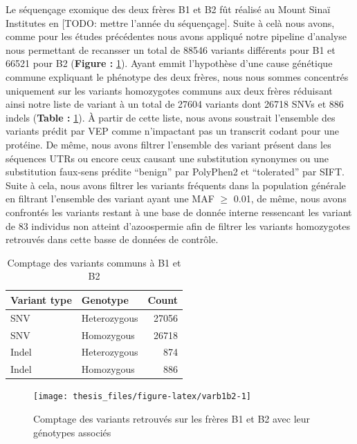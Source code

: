 \documentclass[12pt,twoside]{reedthesis}
\theoremstyle{definition}
\theoremstyle{definition}
\theoremstyle{remark}
\begin{document}
  Le séquençage exomique des deux frères B1 et B2 fût réalisé au Mount
  Sinaï Institutes en {[}TODO: mettre l'année du séquençage{]}. Suite à
  celà nous avons, comme pour les études précédentes nous avons appliqué
  notre pipeline d'analyse nous permettant de recansser un total de 88546
  variants différents pour B1 et 66521 pour B2 (\textbf{Figure :
  }\ref{fig:varb1b2}). Ayant emmit l'hypothèse d'une cause génétique
  commune expliquant le phénotype des deux frères, nous nous sommes
  concentrés uniquement sur les variants homozygotes communs aux deux
  frères réduisant ainsi notre liste de variant à un total de 27604
  variants dont 26718 SNVs et 886 indels (\textbf{Table :
  }\ref{tab:tabcommonvar}). À partir de cette liste, nous avons soustrait
  l'ensemble des variants prédit par VEP comme n'impactant pas un
  transcrit codant pour une protéine. De même, nous avons filtrer
  l'ensemble des variant présent dans les séquences UTRs ou encore ceux
  causant une substitution synonymes ou une substitution faux-sens prédite
  ``benign'' par PolyPhen2 et ``tolerated'' par SIFT. Suite à cela, nous
  avons filtrer les variants fréquents dans la population générale en
  filtrant l'ensemble des variant ayant une MAF \(\ge\) 0.01, de même,
  nous avons confrontés les variants restant à une base de donnée interne
  ressencant les variant de 83 individus non atteint d'azoospermie afin de
  filtrer les variants homozygotes retrouvés dans cette basse de données
  de contrôle.
  
  \begin{table}
  
  \caption{\label{tab:tabcommonvar}Comptage des variants communs à B1 et B2}
  \centering
  \begin{tabular}[t]{l|l|r}
  \hline
  Variant type & Genotype & Count\\
  \hline
  SNV & Heterozygous & 27056\\
  \hline
  SNV & Homozygous & 26718\\
  \hline
  Indel & Heterozygous & 874\\
  \hline
  Indel & Homozygous & 886\\
  \hline
  \end{tabular}
  \end{table}
  
  \begin{figure}
  
  {\centering \texttt{[image: thesis\_files/figure-latex/varb1b2-1]} 
  
  }
  
  \caption[Comptage des variants retrouvés sur les frères B1 et B2 avec leur génotypes associés]{Comptage des variants retrouvés sur les frères B1 et B2 avec leur génotypes associés}\label{fig:varb1b2}
  \end{figure}
  
\end{document}
